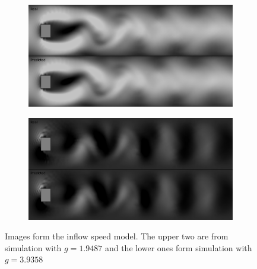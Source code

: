 \documentclass{llncs}
\begin{document}
\begin{figure}
  \begin{subfigure}{.5\textwidth}
    \centering
    \includegraphics[width=1\linewidth]{imgs/x_recursive_0_speed_39}
  \end{subfigure}
  \begin{subfigure}{.5\textwidth}
    \centering
    \includegraphics[width=1\linewidth]{imgs/y_recursive_0_speed_39}
  \end{subfigure}
  \begin{center}
    Images form the inflow speed model. The upper two are from simulation with $g=1.9487$ and the lower ones form simulation with $g=3.9358$
  \end{center}


\end{figure}
\end{document}
